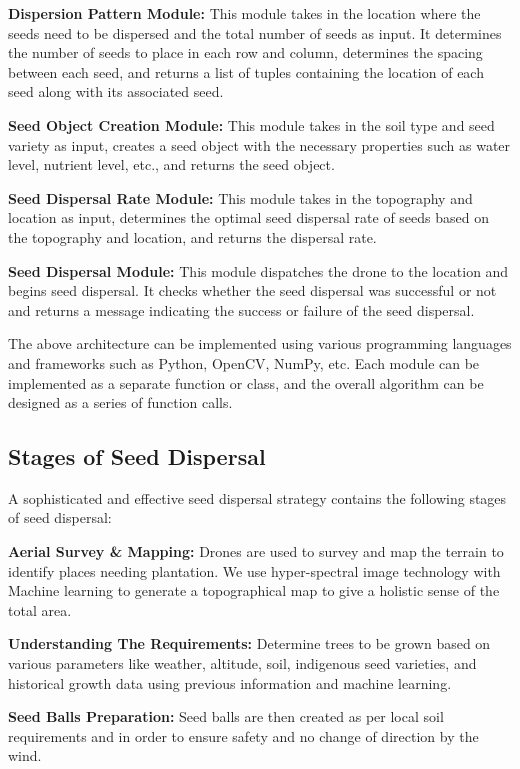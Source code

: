 \documentclass[pmlr,twocolumn,10pt]{jmlr}
\begin{document}
\textbf{Dispersion Pattern Module:} This module takes in the location where the seeds need to be dispersed and the total number of seeds as input. It determines the number of seeds to place in each row and column, determines the spacing between each seed, and returns a list of tuples containing the location of each seed along with its associated seed.

\textbf{Seed Object Creation Module:} This module takes in the soil type and seed variety as input, creates a seed object with the necessary properties such as water level, nutrient level, etc., and returns the seed object.

\textbf{Seed Dispersal Rate Module:} This module takes in the topography and location as input, determines the optimal seed dispersal rate of seeds based on the topography and location, and returns the dispersal rate.

\textbf{Seed Dispersal Module:} This module dispatches the drone to the location and begins seed dispersal. It checks whether the seed dispersal was successful or not and returns a message indicating the success or failure of the seed dispersal.

The above architecture can be implemented using various programming languages and frameworks such as Python, OpenCV, NumPy, etc. Each module can be implemented as a separate function or class, and the overall algorithm can be designed as a series of function calls.

\subsection{Stages of Seed Dispersal}

 A sophisticated and effective seed dispersal strategy contains the following stages of seed dispersal:
 
\textbf{Aerial Survey \& Mapping:} Drones are used to survey and map the terrain to identify places needing plantation. We use hyper-spectral image technology with Machine learning to generate a topographical map to give a holistic sense of the total area.

\textbf{Understanding The Requirements:} Determine trees to be grown based on various parameters like weather, altitude, soil, indigenous seed varieties, and historical growth data using previous information and machine learning.

\textbf{Seed Balls Preparation:} Seed balls are then created as per local soil requirements and in order to ensure safety and no change of direction by the wind.
\end{document}
